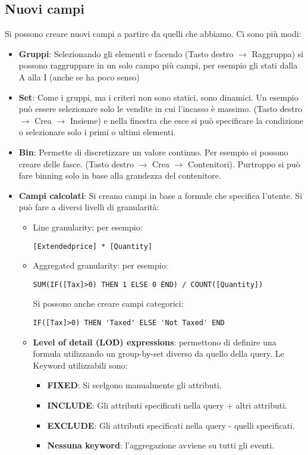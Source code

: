 \subsection{Nuovi campi}
Si possono creare nuovi campi a partire da quelli che abbiamo. Ci sono più modi:
\begin{itemize}
	\item \textbf{Gruppi}: Selezionando gli elementi e facendo (Tasto destro $\xrightarrow{}$ Raggruppa) si possono raggruppare in un solo campo più campi, per esempio gli stati dalla A alla I (anche se ha poco senso)
	\item \textbf{Set}: Come i gruppi, ma i criteri non sono statici, sono dinamici. Un esempio può essere selezionare solo le vendite in cui l'incasso è massimo. (Tasto destro $\xrightarrow{}$ Crea $\xrightarrow{}$ Insieme) e nella finestra che esce si può specificare la condizione o selezionare solo i primi o ultimi elementi.
	\item \textbf{Bin}: Permette di discretizzare un valore continuo. Per esempio si possono creare delle fasce. (Tasto destro $\xrightarrow{}$ Crea $\xrightarrow{}$ Contenitori). Purtroppo si può fare binning solo in base alla grandezza del contenitore.
	\item \textbf{Campi calcolati}: Si creano campi in base a formule che specifica l'utente. Si può fare a diversi livelli di granularità:
	\begin{itemize}
		\item Line granularity: per esempio:
		\begin{verbatim}
[Extendedprice] * [Quantity]
		\end{verbatim}
		\item Aggregated granularity: per esempio:\newline
		\begin{verbatim}
SUM(IF([Tax]>0) THEN 1 ELSE 0 END) / COUNT([Quantity])
		\end{verbatim}
		Si possono anche creare campi categorici:
		\begin{verbatim}
IF([Tax]>0) THEN 'Taxed' ELSE 'Not Taxed' END
		\end{verbatim}
		\item\textbf{ Level of detail (LOD) expressions}: permettono di definire una formula utilizzando un group-by-set diverso da quello della query. Le Keyword utilizzabili sono:
		\begin{itemize}
			\item \textbf{FIXED}: Si scelgono manualmente gli attributi.
			\item \textbf{INCLUDE}: Gli attributi specificati nella query + altri attributi.
			\item \textbf{EXCLUDE}: Gli attributi specificati nella query - quelli specificati.
			\item \textbf{Nessuna keyword}: l'aggregazione avviene su tutti gli eventi.
		\end{itemize}
	\end{itemize}
\end{itemize}

